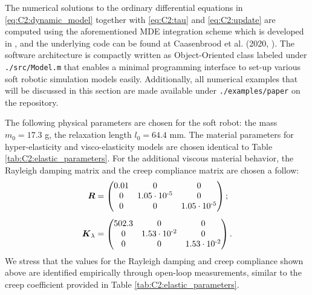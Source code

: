 The numerical solutions to the ordinary differential equations in \eqref{eq:C2:dynamic_model} together with \eqref{eq:C2:tau} and \eqref{eq:C2:update} are computed using the aforementioned MDE integration scheme which is developed in \matlab, and the underlying code can be found at Caasenbrood et al. (2020, \cite{Caasenbrood2021}). The software architecture is compactly written as Object-Oriented class labeled under \texttt{./src/Model.m} that enables a minimal programming interface to set-up various soft robotic simulation models easily. Additionally, all numerical examples that will be discussed in this section are made available under \texttt{./examples/paper} on the repository.
%
\begin{example}
\end{example}
\noindent The following physical parameters are chosen for the soft robot: the mass $m_0 = 17.3$ g, the relaxation length $l_0 = 64.4$ mm. The material parameters for hyper-elasticity and visco-elasticity models are chosen identical to Table \ref{tab:C2:elastic_parameters}. For the additional viscous material behavior, the Rayleigh damping matrix and the creep compliance matrix are chosen a follow:
%
\begin{align}
\boldsymbol{R} & = \begin{pmatrix} 0.01 & 0 & 0 \\ 0 &  1.05\cdot10^{\textrm{-5}} & 0 \\ 0 & 0 & 1.05\cdot10^{\textrm{-5}} \end{pmatrix}; \notag \\[0.45em]
\boldsymbol{K}_{\lambda} & = \begin{pmatrix} 502.3 & 0 & 0 \\ 0 &  1.53\cdot10^{\textrm{-2}} & 0 \\ 0 & 0 & 1.53\cdot10^{\textrm{-2}} \end{pmatrix}. \notag
\end{align}
%
\noindent We stress that the values for the Rayleigh damping and creep compliance shown above are identified empirically {through} open-loop measurements, similar to the creep coefficient provided in Table \ref{tab:C2:elastic_parameters}.
%

